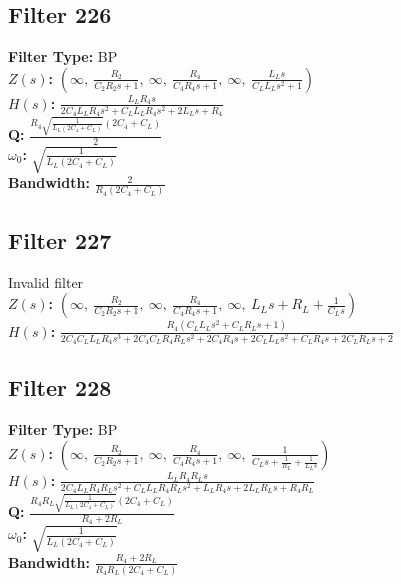 \documentclass{article}
\begin{document}
\subsection*{Filter 226}
\textbf{Filter Type:} BP \\ 
\textbf{$Z(s)$:} $\left( \infty, \  \frac{R_{2}}{C_{2} R_{2} s + 1}, \  \infty, \  \frac{R_{4}}{C_{4} R_{4} s + 1}, \  \infty, \  \frac{L_{L} s}{C_{L} L_{L} s^{2} + 1}\right)$ \\ 
\textbf{$H(s)$:} $\frac{L_{L} R_{4} s}{2 C_{4} L_{L} R_{4} s^{2} + C_{L} L_{L} R_{4} s^{2} + 2 L_{L} s + R_{4}}$ \\ 
\textbf{Q:} $\frac{R_{4} \sqrt{\frac{1}{L_{L} \left(2 C_{4} + C_{L}\right)}} \left(2 C_{4} + C_{L}\right)}{2}$ \\ 
\textbf{$\omega_0$:} $\sqrt{\frac{1}{L_{L} \left(2 C_{4} + C_{L}\right)}}$ \\ 
\textbf{Bandwidth:} $\frac{2}{R_{4} \left(2 C_{4} + C_{L}\right)}$ \\ 
\subsection*{Filter 227}
Invalid filter \\ 
\textbf{$Z(s)$:} $\left( \infty, \  \frac{R_{2}}{C_{2} R_{2} s + 1}, \  \infty, \  \frac{R_{4}}{C_{4} R_{4} s + 1}, \  \infty, \  L_{L} s + R_{L} + \frac{1}{C_{L} s}\right)$ \\ 
\textbf{$H(s)$:} $\frac{R_{4} \left(C_{L} L_{L} s^{2} + C_{L} R_{L} s + 1\right)}{2 C_{4} C_{L} L_{L} R_{4} s^{3} + 2 C_{4} C_{L} R_{4} R_{L} s^{2} + 2 C_{4} R_{4} s + 2 C_{L} L_{L} s^{2} + C_{L} R_{4} s + 2 C_{L} R_{L} s + 2}$ \\ 
\subsection*{Filter 228}
\textbf{Filter Type:} BP \\ 
\textbf{$Z(s)$:} $\left( \infty, \  \frac{R_{2}}{C_{2} R_{2} s + 1}, \  \infty, \  \frac{R_{4}}{C_{4} R_{4} s + 1}, \  \infty, \  \frac{1}{C_{L} s + \frac{1}{R_{L}} + \frac{1}{L_{L} s}}\right)$ \\ 
\textbf{$H(s)$:} $\frac{L_{L} R_{4} R_{L} s}{2 C_{4} L_{L} R_{4} R_{L} s^{2} + C_{L} L_{L} R_{4} R_{L} s^{2} + L_{L} R_{4} s + 2 L_{L} R_{L} s + R_{4} R_{L}}$ \\ 
\textbf{Q:} $\frac{R_{4} R_{L} \sqrt{\frac{1}{L_{L} \left(2 C_{4} + C_{L}\right)}} \left(2 C_{4} + C_{L}\right)}{R_{4} + 2 R_{L}}$ \\ 
\textbf{$\omega_0$:} $\sqrt{\frac{1}{L_{L} \left(2 C_{4} + C_{L}\right)}}$ \\ 
\textbf{Bandwidth:} $\frac{R_{4} + 2 R_{L}}{R_{4} R_{L} \left(2 C_{4} + C_{L}\right)}$ \\ 
\end{document}

